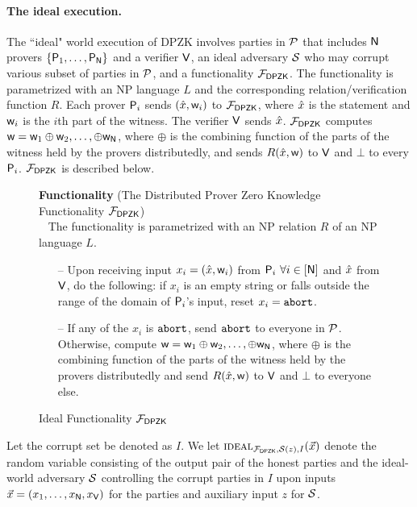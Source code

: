 \paragraph{The ideal execution.} The ``ideal" world execution of DPZK  involves parties in $\mathcal{P}$ that includes $\mathsf{N}$ provers $\{\mathsf{P}_1, \ldots, \mathsf{P}_{\mathsf{N}}\}$ and a verifier $\mathsf{V}$,  an ideal adversary $\mathcal{S}$ who may corrupt various subset of parties in $\mathcal{P}$, and a  functionality $\mathcal{F}_{\mathsf{DPZK}}$.  The functionality is parametrized with an  NP language $L$ and  the corresponding relation/verification function $R$. Each prover $\mathsf{P}_i$ sends $(\hat{x},\mathsf{w}_i)$ to $\mathcal{F}_{\mathsf{DPZK}}$, where $\hat{x}$ is the statement and $\mathsf{w}_i$ is the $i$th part of the witness. The verifier $\mathsf{V}$ sends $\hat{x}$.  $\mathcal{F}_{\mathsf{DPZK}}$ computes $\mathsf{w} = \mathsf{w}_1 \oplus \mathsf{w}_2,\ldots,\oplus \mathsf{w}_{\mathsf{N}}$, where $\oplus$ is the combining function of the parts of the witness held by the provers distributedly, and sends $R(\hat{x},\mathsf{w})$ to $\mathsf{V}$ and $\bot$ to every $\mathsf{P}_i$. $\mathcal{F}_{\mathsf{DPZK}}$  is described below. 
\begin{figure}[H]
	\centering
	\begin{framed}
		\textbf{Functionality} (The Distributed Prover Zero Knowledge Functionality $\mathcal{F}_{\mathsf{DPZK}}$)\\~
		The functionality is parametrized with an NP relation $R$ of an NP language $L$.
		\begin{itemize}
		\item[--] Upon receiving input $x_i = (\hat{x}, \mathsf{w}_i)$ from $\mathsf{P}_i$ $\forall i\in[\mathsf{N}]$ and $\hat{x}$ from $\mathsf{V}$, do the following: if $x_i$ is an empty string or falls outside the range of the domain of $\mathsf{P}_i$'s input,  reset $x_i = \texttt{abort}$. 
			\item[--] If any of the $x_i$ is $\texttt{abort}$, send $\texttt{abort}$ to everyone in $\mathcal{P}$. Otherwise,   compute $\mathsf{w} = \mathsf{w}_1 \oplus \mathsf{w}_2,\ldots, \oplus \mathsf{w}_{\mathsf{N}}$, where $\oplus$ is the combining function of the parts of the witness held by the provers distributedly and send $R(\hat{x}, \mathsf{w})$ to $\mathsf{V}$ and $\bot$ to everyone else. 
		\end{itemize}
	\end{framed}
	\caption{Ideal Functionality $\mathcal{F}_{\mathsf{DPZK}}$}
\end{figure} \label{func:DPZK}

Let the corrupt set be denoted as $I$. We let $\textsc{ideal}_{\mathcal{F}_{\mathsf{DPZK}}, \mathcal{S}(z),I}(\vec{x})$ denote the random variable consisting of the output pair of the honest parties and the ideal-world adversary $\mathcal{S}$ controlling the corrupt parties in $I$ upon inputs $\vec{x} = (x_1  ,\ldots,x_{\mathsf{N}},x_{\mathsf{V}})$ for the parties and auxiliary input $z$ for $\mathcal{S}$.  


